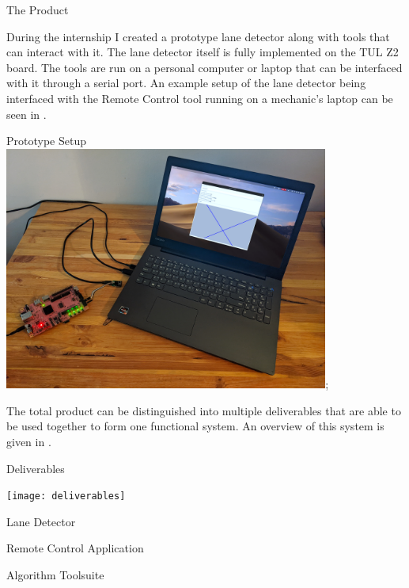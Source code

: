 \documentclass{matthijs}
\begin{document}
	\begin{hoofdstuk}{The Product}

		During the internship I created a prototype lane detector along with tools that can interact with it.
		The lane detector itself is fully implemented on the TUL Z2 board.
		The tools are run on a personal computer or laptop that can be interfaced with it through a serial port.
		An example setup of the lane detector being interfaced with the Remote Control tool running on a mechanic's laptop can be seen in .

		\begin{figuur}{Prototype Setup}
			\includegraphics[width=0.8\textwidth]{product-5.png};
		\end{figuur}

		The total product can be distinguished into multiple deliverables that are able to be used together to form one functional system.
		An overview of this system is given in .

		\begin{figuur}{Deliverables}
			\vspace{2ex}
			\centerline{
				\texttt{[image: deliverables]}
			}
		\end{figuur}

		\begin{paragraaf}{Lane Detector}

		\end{paragraaf}

		\begin{paragraaf}{Remote Control Application}

		\end{paragraaf}

		\begin{paragraaf}{Algorithm Toolsuite}

		\end{paragraaf}

	\end{hoofdstuk}
	
\end{document}

